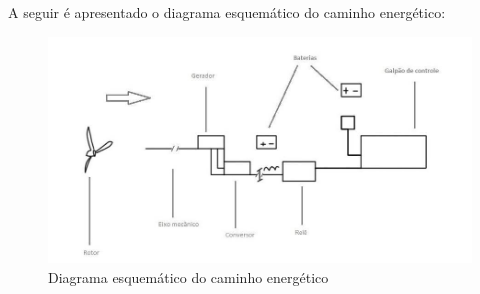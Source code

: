 A seguir é apresentado o diagrama esquemático do caminho energético:
\begin{figure}[!ht]
\centering
\includegraphics[scale=0.5]{editaveis/figuras/diagrama_energetico}
\caption[Diagrama energético]{Diagrama esquemático do caminho energético}
\label{energertico}
\end{figure}
\FloatBarrier